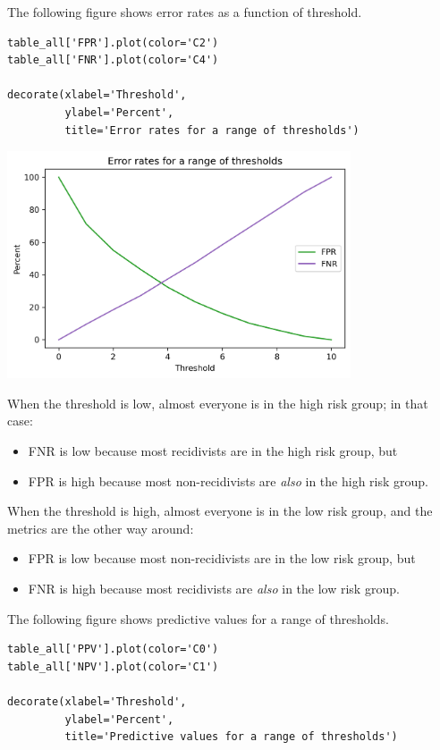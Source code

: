The following figure shows error rates as a function of threshold.

\begin{lstlisting}[]
table_all['FPR'].plot(color='C2')
table_all['FNR'].plot(color='C4')

decorate(xlabel='Threshold', 
         ylabel='Percent',
         title='Error rates for a range of thresholds')
\end{lstlisting}

\begin{center}
\includegraphics[width=4in]{chapters/02_calibration_files/02_calibration_37_0.png}
\end{center}

When the threshold is low, almost everyone is in the high risk group; in
that case:

\begin{itemize}
\item
  FNR is low because most recidivists are in the high risk group, but
\item
  FPR is high because most non-recidivists are \emph{also} in the high
  risk group.
\end{itemize}

When the threshold is high, almost everyone is in the low risk group,
and the metrics are the other way around:

\begin{itemize}
\item
  FPR is low because most non-recidivists are in the low risk group, but
\item
  FNR is high because most recidivists are \emph{also} in the low risk
  group.
\end{itemize}

The following figure shows predictive values for a range of thresholds.

\begin{lstlisting}[]
table_all['PPV'].plot(color='C0')
table_all['NPV'].plot(color='C1')

decorate(xlabel='Threshold', 
         ylabel='Percent',
         title='Predictive values for a range of thresholds')
\end{lstlisting}

